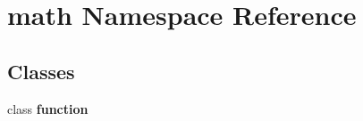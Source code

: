 \section{math Namespace Reference}
\label{namespacemath}
\subsection*{Classes}
\begin{CompactItemize}
\item 
class {\bf function}
\end{CompactItemize}
